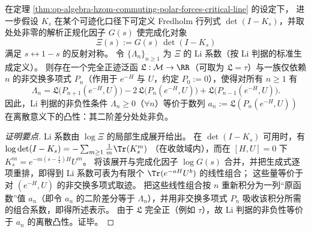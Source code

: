 \begin{proposition}\label{prop:op-algebra-li-criterion-operatorized}
在定理 \ref{thm:op-algebra-hzom-commuting-polar-forces-critical-line} 的设定下，
进一步假设 \(K_s\) 在某个可迹化口径下可定义 Fredholm 行列式 \(\det(I-K_s)\)，并取处处非零的解析正规化因子 \(G(s)\) 使完成化对象
\[
\Xi(s):=G(s)\,\det(I-K_s)
\]
满足 \(s\leftrightarrow 1-s\) 的反射对称。
令 \(\{\Lambda_n\}_{n\ge 1}\) 为 \(\Xi\) 的 Li 系数（按 Li 判据的标准生成定义）。
则存在一个完全正迹泛函 \(\mathfrak{L}:\mathcal{M}\to\RR\)（可取为 \(\mathfrak{L}=\tau\)）与一族仅依赖 \(n\) 的非交换多项式 \(P_n\)（作用于 \(e^{-H}\) 与 \(U\)，约定 \(P_0:=0\)），使得对所有 \(n\ge 1\) 有
\[
\boxed{\;
\Lambda_n
=\mathfrak{L}\!\bigl(P_{n+1}(e^{-H},U)\bigr)
-2\,\mathfrak{L}\!\bigl(P_{n}(e^{-H},U)\bigr)
+\mathfrak{L}\!\bigl(P_{n-1}(e^{-H},U)\bigr).\;}
\]
因此，Li 判据的非负性条件 \(\Lambda_n\ge 0\)（\(\forall n\)）等价于数列
\(
a_n:=\mathfrak{L}(P_n(e^{-H},U))
\)
在离散意义下的凸性：其二阶差分处处非负。
\end{proposition}
\begin{proof}[证明要点]
Li 系数由 \(\log \Xi\) 的局部生成展开给出。
在 \(\det(I-K_s)\) 可用时，有
\(
\log\det(I-K_s)=-\sum_{m\ge 1}\frac{1}{m}\Tr(K_s^m)
\)
（在收敛域内），而在 \([H,U]=0\) 下 \(K_s^m=e^{-m(s-\tfrac12)H}U^m\)。
将该展开与完成化因子 \(\log G(s)\) 合并，并把生成式逐项重排，即得到 Li 系数可表为有限个 \(\Tr(e^{-aH}U^b)\) 的线性组合；
这些量等价于对 \((e^{-H},U)\) 的非交换多项式取迹。
把这些线性组合按 \(n\) 重新积分为一列“原函数”值 \(a_n\)（即令 \(a_n\) 的二阶差分等于 \(\Lambda_n\)），并用非交换多项式 \(P_n\) 吸收该积分所需的组合系数，即得所述表示。
由于 \(\mathfrak{L}\) 完全正（例如 \(\tau\)），故 Li 判据的非负性等价于 \(a_n\) 的离散凸性。证毕。
\end{proof}

